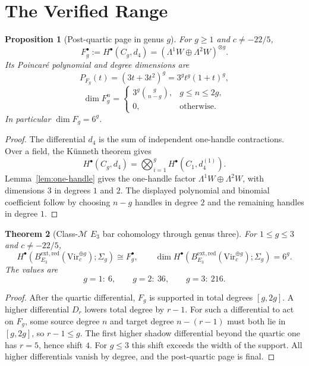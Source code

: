 \documentclass[11pt]{article}
\theoremstyle{plain}
\newtheorem{theorem}{Theorem}
\newtheorem{proposition}[theorem]{Proposition}
\theoremstyle{definition}
\theoremstyle{remark}
\newcommand{\Vir}{\mathrm{Vir}}
\newcommand{\Bext}{B_{E_3}^{\mathrm{ext,red}}}
\begin{document}
\section{The Verified Range}
\label{sec:verified-range}

\begin{proposition}[Post-quartic page in genus $g$]
\label{prop:post-quartic}
For $g\geq 1$ and $c\neq -22/5$,
\[
 F_g^\bullet:=H^\bullet(C_g,d_4)
 =(\Lambda^1W\oplus\Lambda^2W)^{\otimes g}.
\]
Its Poincar\'e polynomial and degree dimensions are
\[
 P_{F_g}(t)=(3t+3t^2)^g=3^g t^g(1+t)^g,
\]
\[
 \dim F_g^n=
 \begin{cases}
  3^g\binom{g}{n-g}, & g\leq n\leq 2g,\\
  0, & \text{otherwise}.
 \end{cases}
\]
In particular $\dim F_g=6^g$.
\end{proposition}

\begin{proof}
The differential $d_4$ is the sum of independent one-handle contractions.
Over a field, the K\"unneth theorem gives
\[
 H^\bullet(C_g,d_4)=
 \bigotimes_{i=1}^g H^\bullet(C_1,d_4^{(1)}).
\]
Lemma~\ref{lem:one-handle} gives the one-handle factor
$\Lambda^1W\oplus\Lambda^2W$, with dimensions $3$ in degrees $1$ and $2$.
The displayed polynomial and binomial coefficient follow by choosing
$n-g$ handles in degree $2$ and the remaining handles in degree $1$.
\end{proof}

\begin{theorem}[Class-$\mathcal{M}$ $E_3$ bar cohomology through genus three]
\label{thm:g-leq-three}
For $1\leq g\leq 3$ and $c\neq -22/5$,
\[
 H^\bullet(\Bext(\Vir_c^{\oplus g});\Sigma_g)\cong F_g^\bullet,
 \qquad
 \dim H^\bullet(\Bext(\Vir_c^{\oplus g});\Sigma_g)=6^g.
\]
The values are
\[
 g=1:\ 6,\qquad g=2:\ 36,\qquad g=3:\ 216.
\]
\end{theorem}

\begin{proof}
After the quartic differential, $F_g$ is supported in total degrees
$[g,2g]$. A higher differential $D_r$ lowers total degree by $r-1$.
For such a differential to act on $F_g$, some source degree $n$ and target
degree $n-(r-1)$ must both lie in $[g,2g]$, so $r-1\leq g$. The first
higher shadow differential beyond the quartic one has $r=5$, hence shift
$4$. For $g\leq 3$ this shift exceeds the width of the support. All
higher differentials vanish by degree, and the post-quartic page is final.
\end{proof}
\end{document}

